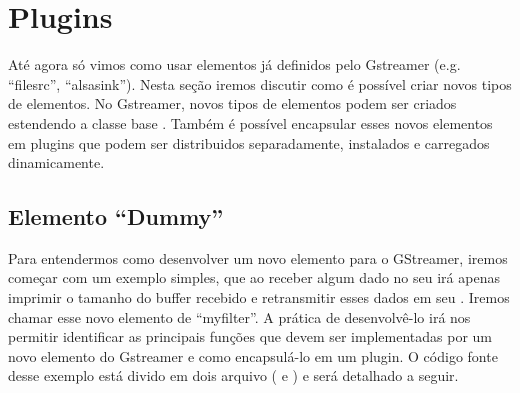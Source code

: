\section{Plugins}
\label{sec:plugins}


Até agora só vimos como usar elementos já definidos pelo Gstreamer (e.g.
``filesrc'', ``alsasink'').  Nesta seção iremos discutir como é possível criar
novos tipos de elementos.  No Gstreamer, novos tipos de elementos podem ser
criados estendendo a classe base .  Também é possível encapsular
esses novos elementos em plugins que podem ser distribuidos separadamente,
instalados e carregados dinamicamente. 



\subsection*{Elemento ``Dummy''}
Para entendermos como desenvolver um novo elemento para  o GStreamer, iremos
começar com um exemplo simples, que ao receber algum dado no seu 
irá apenas imprimir o tamanho do buffer recebido e retransmitir esses dados em
seu .  Iremos chamar esse novo elemento de ``myfilter''.  A
prática de desenvolvê-lo irá nos permitir identificar as principais funções que
devem ser implementadas por um novo elemento do Gstreamer e como encapsulá-lo
em um plugin.  O código fonte desse exemplo está divido em dois arquivo
( e ) e será detalhado a seguir.

